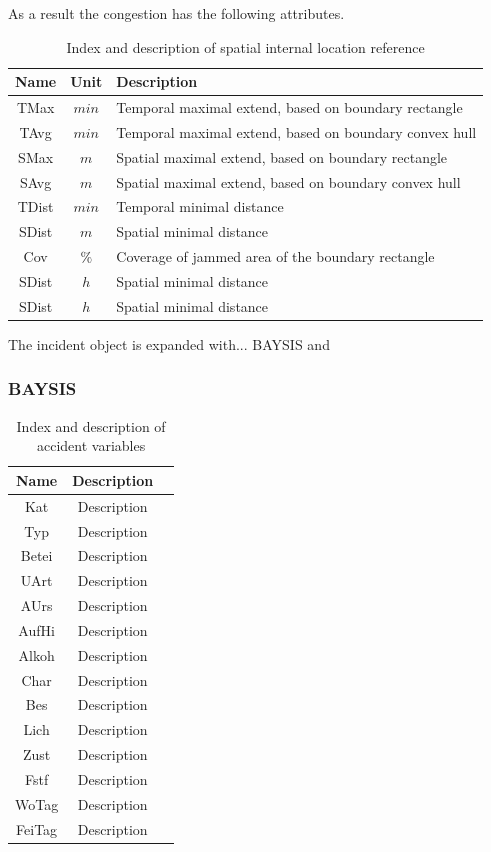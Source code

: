 As a result the congestion has the following attributes.
\noindent
\begin{table}[ht]
	\centering
	\begin{tabular}{c|c|l} 
		\toprule
		Name & Unit & Description \\
		\midrule 
		TMax & $min$ & Temporal maximal extend, based on boundary rectangle\\
		TAvg & $min$ & Temporal maximal extend, based on boundary convex hull\\
		SMax & $m$ & Spatial maximal extend, based on boundary rectangle\\
		SAvg & $m$ & Spatial maximal extend, based on boundary convex hull\\
		TDist & $min$ & Temporal minimal distance\\
		SDist & $m$ & Spatial minimal distance\\
		Cov & $\%$ & Coverage of jammed area of the boundary rectangle\\
		SDist & $h$ & Spatial minimal distance\\
		SDist & $h$ & Spatial minimal distance\\
		\bottomrule
	\end{tabular}
	\caption{Index and description of spatial internal location reference}
\end{table}

\bigskip
    
The incident object is expanded with... BAYSIS and 

\subsubsection{BAYSIS}


\noindent
\begin{table}[ht]
	\centering
	\begin{tabular}{c|c|l} 
		\toprule
		Name & Description \\
		\midrule 
		Kat & Description \\
		Typ & Description \\
		Betei & Description \\
		UArt & Description \\
		AUrs & Description \\
		AufHi & Description \\
		Alkoh & Description \\
		Char & Description \\
		Bes & Description \\
		Lich & Description \\
		Zust & Description \\
		Fstf & Description \\
		WoTag & Description \\
		FeiTag & Description \\
		\bottomrule
	\end{tabular}
	\caption{Index and description of accident variables}
\end{table}

